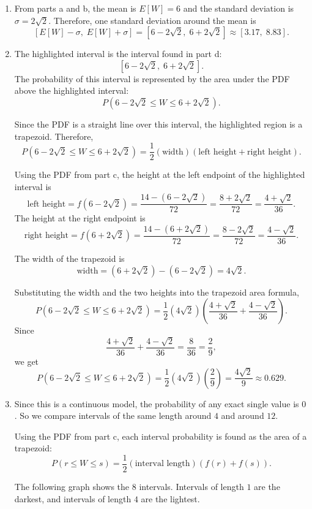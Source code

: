 \begin{enumerate}[label=\textbf{\alph*)}]
	\item From parts a and b, the mean is \(E[W]=6\) and the standard deviation is \(\sigma=2\sqrt{2}\). Therefore, one standard deviation around the mean is
	\[
	[E[W]-\sigma,\;E[W]+\sigma]
	=
	[6-2\sqrt{2},\;6+2\sqrt{2}]
	\approx [3.17,\;8.83].
	\]
	
	
		\item The highlighted interval is the interval found in part d:
	\[
	[6-2\sqrt{2},\;6+2\sqrt{2}].
	\]
	The probability of this interval is represented by the area under the PDF above the highlighted interval:
	\[
	P(6-2\sqrt{2}\le W\le 6+2\sqrt{2}).
	\]
	
	Since the PDF is a straight line over this interval, the highlighted region is a trapezoid. Therefore,
	\[
	P(6-2\sqrt{2}\le W\le 6+2\sqrt{2})
	=
	\frac{1}{2}(\text{width})(\text{left height}+\text{right height}).
	\]
	
	Using the PDF from part c, the height at the left endpoint of the highlighted interval is
	\[
	\text{left height}=f(6-2\sqrt{2})
	=
	\frac{14-(6-2\sqrt{2})}{72}
	=
	\frac{8+2\sqrt{2}}{72}
	=
	\frac{4+\sqrt{2}}{36}.
	\]
	The height at the right endpoint is
	\[
	\text{right height}=f(6+2\sqrt{2})
	=
	\frac{14-(6+2\sqrt{2})}{72}
	=
	\frac{8-2\sqrt{2}}{72}
	=
	\frac{4-\sqrt{2}}{36}.
	\]
	
	The width of the trapezoid is
	\[
	\text{width}
	=
	(6+2\sqrt{2})-(6-2\sqrt{2})
	=
	4\sqrt{2}.
	\]
	
	Substituting the width and the two heights into the trapezoid area formula,
	\[
	P(6-2\sqrt{2}\le W\le 6+2\sqrt{2})
	=
	\frac{1}{2}(4\sqrt{2})
	\left(
	\frac{4+\sqrt{2}}{36}
	+
	\frac{4-\sqrt{2}}{36}
	\right).
	\]
	Since
	\[
	\frac{4+\sqrt{2}}{36}
	+
	\frac{4-\sqrt{2}}{36}
	=
	\frac{8}{36}
	=
	\frac{2}{9},
	\]
	we get
	\[
	P(6-2\sqrt{2}\le W\le 6+2\sqrt{2})
	=
	\frac{1}{2}(4\sqrt{2})\left(\frac{2}{9}\right)
	=
	\frac{4\sqrt{2}}{9}
	\approx 0.629.
	\]
	
	\item Since this is a continuous model, the probability of any exact single value is \(0\). So we compare intervals of the same length around \(4\) and around \(12\).
	
	Using the PDF from part c, each interval probability is found as the area of a trapezoid:
	\[
	P(r\le W\le s)
	=
	\frac{1}{2}(\text{interval length})(f(r)+f(s)).
	\]
	
		The following graph shows the \(8\) intervals. Intervals of length \(1\) are the darkest, and intervals of length \(4\) are the lightest.
	

\end{enumerate}
